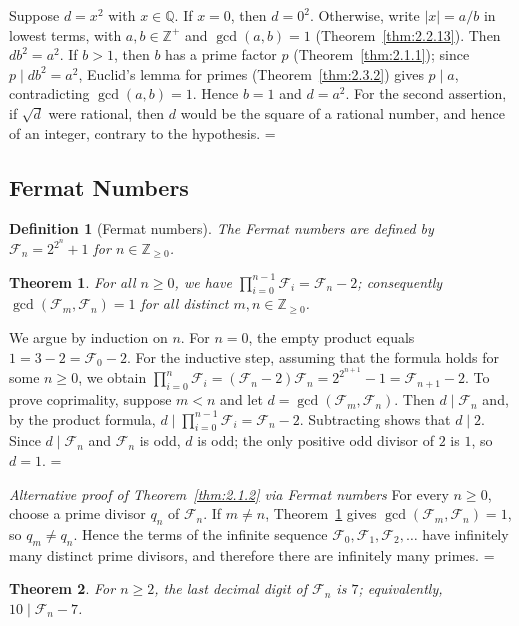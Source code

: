 \documentclass[11pt]{article}
\makeatletter
\theoremstyle{ntstyle}
\newtheorem{theorem}{Theorem}[subsection]
\newtheorem{definition}{Definition}[subsection]
\let\nt@closedisplay\]
\def\nt@guardedclose{\@ifnextchar\par{\nt@closeafterpar}{\@ifnextchar\end{\postdisplaypenalty\@M\nt@closedisplay}{\nt@closedisplay}}}
\def\nt@closeafterpar\par{\@ifnextchar\par{\nt@closeafterpar}{\@ifnextchar\end{\postdisplaypenalty\@M\nt@closedisplay\par}{\nt@closedisplay\par}}}
\renewenvironment{proof}[1][\proofname]{\par
  \pushQED{\qed}\normalfont\topsep\medskipamount\edef\nt@afterproof{\@endparpenalty=\the\@endparpenalty\relax}\@beginparpenalty\@M\@endparpenalty\@M\let\]\nt@guardedclose\trivlist\item[]\textit{#1\@addpunct{.}} \ignorespaces}{\ifvmode\addpenalty\@M\fi\popQED\nt@afterproof\endtrivlist\@endpefalse}
\newenvironment{altproof}[1][\proofname]{\begin{proof}[#1]}{\end{proof}}
\makeatother
\begin{document}
\begin{proof} Suppose $d=x^2$ with $x\in\mathbb{Q}$. If $x=0$, then
	$d=0^2$. Otherwise, write $|x|=a/b$ in lowest terms, with $a,b\in\mathbb{Z}^+$ and
	$\gcd(a,b)=1$ (Theorem~\ref{thm:2.2.13}). Then
	$db^2=a^2$. If $b>1$, then $b$ has a prime factor $p$
	(Theorem~\ref{thm:2.1.1}); since $p\mid db^2=a^2$, Euclid's lemma for primes
	(Theorem~\ref{thm:2.3.2}) gives $p\mid a$, contradicting $\gcd(a,b)=1$.
	Hence $b=1$ and $d=a^2$. For the second assertion, if $\sqrt{d}$ were
	rational, then $d$ would be the square of a rational number, and hence of
	an integer, contrary to the hypothesis.
\end{proof}
\subsection{Fermat Numbers}
\begin{definition}[Fermat numbers]\label{def:2.4.1} The Fermat numbers are defined by $\mathcal{F}_n =
			2^{2^{n}} + 1$ for $n\in\mathbb{Z}_{\ge0}$.
\end{definition}
\begin{theorem}\label{thm:2.4.1}
	For all $n\ge0$, we have $\prod_{i=0}^{n-1}\mathcal{F}_i=\mathcal{F}_n-2$;
	consequently $\gcd(\mathcal{F}_m,\mathcal{F}_n)=1$ for all distinct $m,n\in\mathbb{Z}_{\ge0}$.
\end{theorem}

\begin{proof} We argue by induction on $n$. For $n=0$, the empty
	product equals $1 = 3 - 2 = \mathcal{F}_0 - 2$. For the inductive step,
	assuming that the formula holds for some $n\ge0$, we obtain
	$\prod_{i=0}^{n}\mathcal{F}_i = (\mathcal{F}_n-2)\mathcal{F}_n =
			2^{2^{n+1}} - 1 = \mathcal{F}_{n+1}-2$. To prove coprimality, suppose $m<n$ and
	let $d=\gcd(\mathcal{F}_m,\mathcal{F}_n)$.
	Then $d\mid\mathcal{F}_n$ and, by the product formula,
	$d\mid\prod_{i=0}^{n-1}\mathcal{F}_i=\mathcal{F}_n-2$.
	Subtracting shows that $d\mid2$. Since $d\mid\mathcal{F}_n$ and
	$\mathcal{F}_n$ is odd, $d$ is odd; the only positive odd divisor of $2$
	is $1$, so $d=1$.
\end{proof}
\begin{altproof}[Alternative proof of Theorem~\ref{thm:2.1.2} via Fermat numbers]
	For every $n\ge0$, choose a prime divisor $q_n$ of $\mathcal{F}_n$.
	If $m\neq n$, Theorem~\ref{thm:2.4.1} gives
	$\gcd(\mathcal{F}_m, \mathcal{F}_n)=1$, so $q_m\neq q_n$. Hence the terms of the
	infinite sequence $\mathcal{F}_0,\mathcal{F}_1,\mathcal{F}_2,\ldots$
	have infinitely many distinct prime divisors, and therefore there are
	infinitely many primes.
\end{altproof}
\begin{theorem}\label{thm:2.4.2} For $n\ge2$, the last
	decimal digit of $\mathcal{F}_n$ is $7$; equivalently, $10\mid
		\mathcal{F}_n-7$.
\end{theorem}
\end{document}
